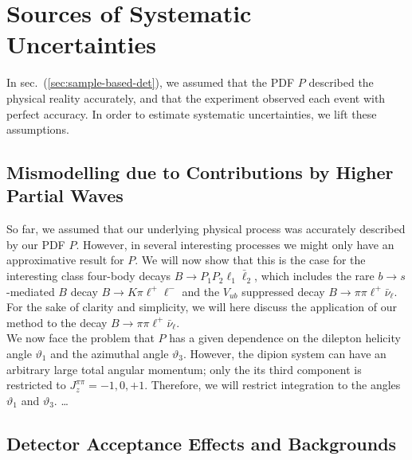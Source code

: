 \documentclass[aps,prd,reprint,nofootinbib,preprintnumbers]{revtex4}
\newcommand{\refsec}[1]{sec.~(\ref{sec:#1})}
\renewcommand{\theta}{\vartheta}
\newcommand{\danny}[1]{{\color{purple}#1}}
\begin{document}
\section{Sources of Systematic Uncertainties}
\label{sec:systematics}

In \refsec{sample-based-det}, we assumed that the PDF $P$ described the physical reality accurately,
and that the experiment observed each event with perfect accuracy. In order to estimate systematic
uncertainties, we lift these assumptions.

\subsection{Mismodelling due to Contributions by Higher Partial Waves}
\label{sec:systematics:partial-waves}

\danny{
So far, we assumed that our underlying physical process was accurately described by our PDF $P$.
However, in several interesting processes we might only have an approximative result for $P$.
We will now show that this is the case for the interesting class four-body decays $B\to P_1 P_2 \ell_1 \bar\ell_2$,
which includes the rare $b\to s$-mediated $B$ decay $B \to K\pi\ell^+\ell^-$ and the $V_{ub}$ suppressed decay
$B\to \pi\pi\ell^+\bar\nu_\ell$. For the sake of clarity and simplicity, we will here discuss
the application of our method to the decay $B\to \pi\pi\ell^+\bar\nu_\ell$.\\

We now face the problem that $P$ has a given dependence on the dilepton helicity angle $\theta_1$
and the azimuthal angle $\theta_3$. However, the dipion system can have an arbitrary large
total angular momentum; only the its third component is restricted to $J^{\pi\pi}_z = -1,0,+1$.
Therefore, we will restrict integration to the angles $\theta_1$ and $\theta_3$. \dots
}

\subsection{Detector Acceptance Effects and Backgrounds}
\label{sec:systematics:acceptance}
\end{document}
